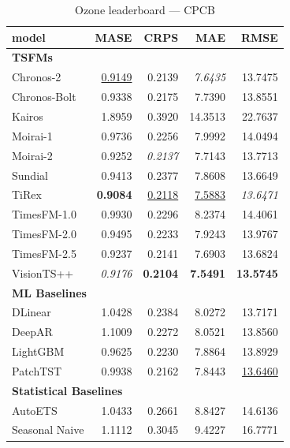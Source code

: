 \begin{table}[H]
\caption{Ozone leaderboard --- CPCB}
\centering
\begin{small}
\begin{tabular}{lrrrr}
\toprule
model & MASE & CRPS & MAE & RMSE \\
\midrule
\multicolumn{5}{l}{\textbf{TSFMs}} \\
Chronos-2 & \underline{0.9149} & 0.2139 & \textit{7.6435} & 13.7475 \\
Chronos-Bolt & 0.9338 & 0.2175 & 7.7390 & 13.8551 \\
Kairos & 1.8959 & 0.3920 & 14.3513 & 22.7637 \\
Moirai-1 & 0.9736 & 0.2256 & 7.9992 & 14.0494 \\
Moirai-2 & 0.9252 & \textit{0.2137} & 7.7143 & 13.7713 \\
Sundial & 0.9413 & 0.2377 & 7.8608 & 13.6649 \\
TiRex & \textbf{0.9084} & \underline{0.2118} & \underline{7.5883} & \textit{13.6471} \\
TimesFM-1.0 & 0.9930 & 0.2296 & 8.2374 & 14.4061 \\
TimesFM-2.0 & 0.9495 & 0.2233 & 7.9243 & 13.9767 \\
TimesFM-2.5 & 0.9237 & 0.2141 & 7.6903 & 13.6824 \\
VisionTS++ & \textit{0.9176} & \textbf{0.2104} & \textbf{7.5491} & \textbf{13.5745} \\
\midrule
\multicolumn{5}{l}{\textbf{ML Baselines}} \\
DLinear & 1.0428 & 0.2384 & 8.0272 & 13.7171 \\
DeepAR & 1.1009 & 0.2272 & 8.0521 & 13.8560 \\
LightGBM & 0.9625 & 0.2230 & 7.8864 & 13.8929 \\
PatchTST & 0.9938 & 0.2162 & 7.8443 & \underline{13.6460} \\
\midrule
\multicolumn{5}{l}{\textbf{Statistical Baselines}} \\
AutoETS & 1.0433 & 0.2661 & 8.8427 & 14.6136 \\
Seasonal Naive & 1.1112 & 0.3045 & 9.4227 & 16.7771 \\
\bottomrule
\end{tabular}
\end{small}
\end{table}